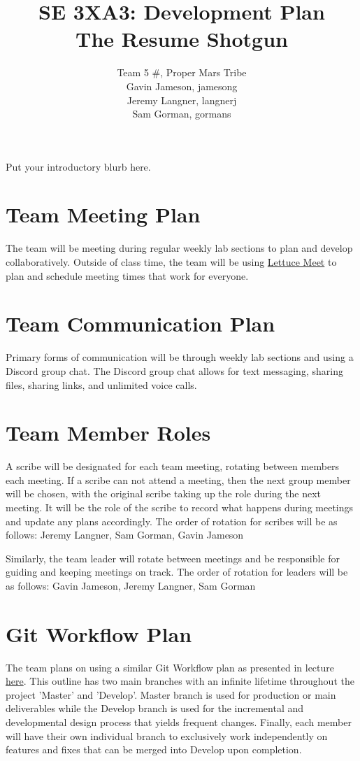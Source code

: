 \documentclass{article}
\title{SE 3XA3: Development Plan\\The Resume Shotgun}
\author{Team 5 \#, Proper Mars Tribe
		\\ Gavin Jameson, jamesong
		\\ Jeremy Langner, langnerj
		\\ Sam Gorman, gormans
}
\date{}
\begin{document}
\maketitle

Put your introductory blurb here.

\section{Team Meeting Plan}
The team will be meeting during regular weekly lab sections to plan and develop collaboratively. Outside of class time, the team will be using \href{https://lettucemeet.com/}{Lettuce Meet} to plan and schedule meeting times that work for everyone.

\section{Team Communication Plan}
Primary forms of communication will be through weekly lab sections and using a Discord group chat. The Discord group chat allows for text messaging, sharing files, sharing links, and unlimited voice calls.
\section{Team Member Roles}
A scribe will be designated for each team meeting, rotating between members each meeting. If a scribe can not attend a meeting, then the next group member will be chosen, with the original scribe taking up the role during the next meeting. It will be the role of the scribe to record what happens during meetings and update any plans accordingly. The order of rotation for scribes will be as follows: Jeremy Langner, Sam Gorman, Gavin Jameson

Similarly, the team leader will rotate between meetings and be responsible for guiding and keeping meetings on track. The order of rotation for leaders will be as follows: Gavin Jameson, Jeremy Langner, Sam Gorman
\section{Git Workflow Plan} \label{sec:gitflow}
The team plans on using a similar Git Workflow plan as presented in lecture  \href{https://nvie.com/posts/a-successful-git-branching-model/}{here}. This outline has two main branches with an infinite lifetime throughout the project 'Master' and 'Develop'. Master branch is used for production or main deliverables while the Develop branch is used for the incremental and developmental design process that yields frequent changes. Finally, each member will have their own individual branch to exclusively work independently on features and fixes that can be merged into Develop upon completion.
\end{document}
